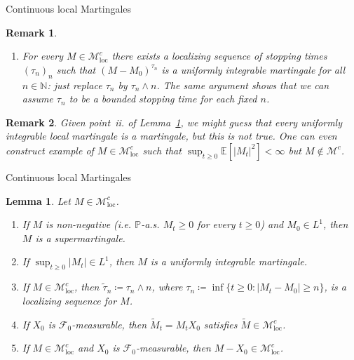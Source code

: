 \documentclass[a4paper]{article}
\theoremstyle{mytheoremstyle}
\newtheorem{lemma}{Lemma}
\newtheorem*{remark}{Remark}
\newcommand{\1}{\mathds{1}}
\begin{document}
\begin{multicols*}{3}
\begin{roundbox}{Continuous local Martingales}
\begin{remark}
\begin{enumerate}[parsep=0.25em]
    \item For every $M \in \mathcal{M}^c_{\operatorname{loc}}$ there exists a
    localizing sequence of stopping times $(\tau_n)_n$ such that $(M -
    M_0)^{\tau_n}$ is a uniformly integrable martingale for all $n \in
    \mathbb{N}$: just replace $\tau_n$ by $\tau_n \wedge n$. The same argument
    shows that we can assume $\tau_n$ to be a bounded stopping time for each
    fixed $n$.
  \end{enumerate}
\end{remark}


\begin{remark}
  \label{rem:locmart.vs.mart}Given point~ii. of
  Lemma~\ref{lem:locmart-properties}, we might guess that every uniformly
  integrable local martingale is a martingale, but this is not true. One can
  even construct example of $M \in \mathcal{M}^c_{\operatorname{loc}}$ such
  that $\sup_{t \geqslant 0} \mathbb{E} [| M_t |^2] < \infty$ but $M \notin
  \mathcal{M}^c$.
\end{remark}
\end{roundbox}

\begin{roundbox}{Continuous local Martingales}
\begin{lemma}
  \label{lem:locmart-properties}Let $M \in \mathcal{M}^c_{\operatorname{loc}}$.
  \begin{enumerate}
    \item If $M$ is non-negative (i.e. $\mathbb{P}$-a.s. $M_t \geqslant 0$ for
    every $t \geqslant 0$) and $M_0 \in L^1$, then $M$ is a supermartingale.
    
    \item If $\sup_{t \geqslant 0} |M_t | \in L^1$, then $M$ is a uniformly
    integrable martingale.
    
    \item If $M \in \mathcal{M}^c_{\operatorname{loc}}$, then $\tilde{\tau}_n \coloneq
    \tau_n \wedge n$, where $\tau_n \coloneq \inf \{t \geqslant 0 : |M_t - M_0
    | \geqslant n\}$, is a localizing sequence for $M$.
    
    \item If $X_0$ is $\mathcal{F}_0$-measurable, then $\tilde{M}_t = M_t X_0$
    satisfies $\tilde{M} \in \mathcal{M}^c_{\operatorname{loc}}$.
    
    \item If $M \in \mathcal{M}^c_{\operatorname{loc}}$ and $X_0$ is
    $\mathcal{F}_0$-measurable, then $M - X_0 \in \mathcal{M}^c_{\operatorname{loc}}$.
  \end{enumerate}
\end{lemma}


\end{roundbox}
\end{multicols*}
\end{document}
